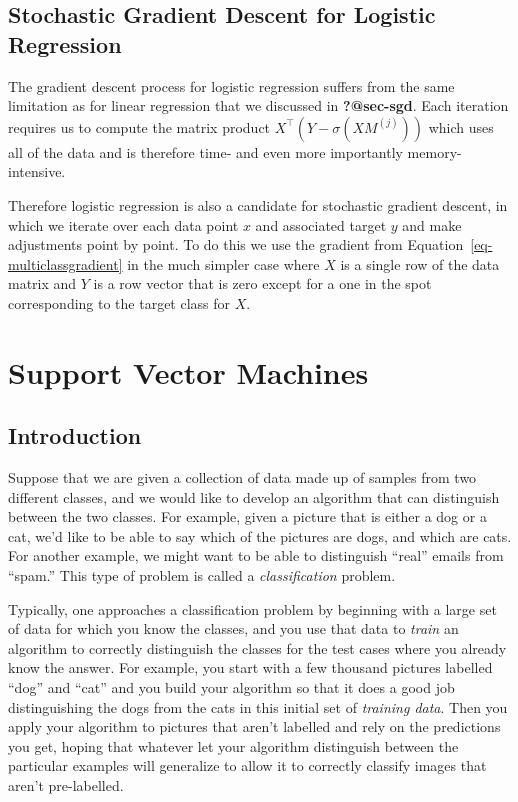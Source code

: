 \documentclass[
  11pt,
  letterpaper,
]{scrbook}
\theoremstyle{plain}
\theoremstyle{plain}
\theoremstyle{remark}
\begin{document}
\hypertarget{stochastic-gradient-descent-for-logistic-regression}{%
\section{Stochastic Gradient Descent for Logistic
Regression}\label{stochastic-gradient-descent-for-logistic-regression}}

The gradient descent process for logistic regression suffers from the
same limitation as for linear regression that we discussed in
\textbf{?@sec-sgd}. Each iteration requires us to compute the matrix
product \(X^{\intercal}(Y-\sigma(XM^{(j)}))\) which uses all of the data
and is therefore time- and even more importantly memory-intensive.

Therefore logistic regression is also a candidate for stochastic
gradient descent, in which we iterate over each data point \(x\) and
associated target \(y\) and make adjustments point by point. To do this
we use the gradient from Equation~\ref{eq-multiclassgradient} in the
much simpler case where \(X\) is a single row of the data matrix and
\(Y\) is a row vector that is zero except for a one in the spot
corresponding to the target class for \(X\).


\hypertarget{support-vector-machines}{%
\chapter{Support Vector Machines}\label{support-vector-machines}}

\hypertarget{introduction-4}{%
\section{Introduction}\label{introduction-4}}

Suppose that we are given a collection of data made up of samples from
two different classes, and we would like to develop an algorithm that
can distinguish between the two classes. For example, given a picture
that is either a dog or a cat, we'd like to be able to say which of the
pictures are dogs, and which are cats. For another example, we might
want to be able to distinguish ``real'' emails from ``spam.'' This type
of problem is called a \emph{classification} problem.

Typically, one approaches a classification problem by beginning with a
large set of data for which you know the classes, and you use that data
to \emph{train} an algorithm to correctly distinguish the classes for
the test cases where you already know the answer. For example, you start
with a few thousand pictures labelled ``dog'' and ``cat'' and you build
your algorithm so that it does a good job distinguishing the dogs from
the cats in this initial set of \emph{training data}. Then you apply
your algorithm to pictures that aren't labelled and rely on the
predictions you get, hoping that whatever let your algorithm distinguish
between the particular examples will generalize to allow it to correctly
classify images that aren't pre-labelled.
\end{document}
